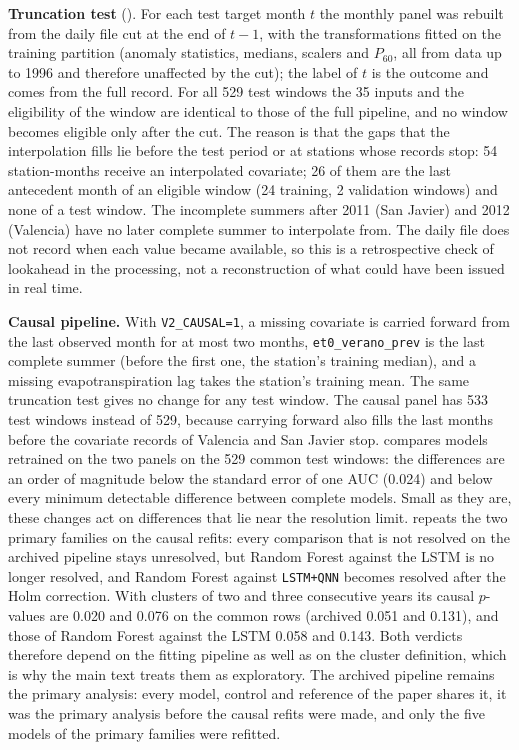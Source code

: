 \documentclass[11pt,a4paper]{article}
\begin{document}
\textbf{Truncation test} (). For each test target month $t$ the monthly panel was rebuilt from the daily file cut at the end of $t-1$, with the transformations fitted on the training partition (anomaly statistics, medians, scalers and $P_{60}$, all from data up to 1996 and therefore unaffected by the cut); the label of $t$ is the outcome and comes from the full record. For all 529 test windows the 35 inputs and the eligibility of the window are identical to those of the full pipeline, and no window becomes eligible only after the cut. The reason is that the gaps that the interpolation fills lie before the test period or at stations whose records stop: 54 station-months receive an interpolated covariate; 26 of them are the last antecedent month of an eligible window (24 training, 2 validation windows) and none of a test window. The incomplete summers after 2011 (San Javier) and 2012 (Valencia) have no later complete summer to interpolate from. The daily file does not record when each value became available, so this is a retrospective check of lookahead in the processing, not a reconstruction of what could have been issued in real time.

\textbf{Causal pipeline.} With \texttt{V2\_CAUSAL=1}, a missing covariate is carried forward from the last observed month for at most two months, \texttt{et0\_verano\_prev} is the last complete summer (before the first one, the station's training median), and a missing evapotranspiration lag takes the station's training mean. The same truncation test gives no change for any test window. The causal panel has 533 test windows instead of 529, because carrying forward also fills the last months before the covariate records of Valencia and San Javier stop.  compares models retrained on the two panels on the 529 common test windows: the differences are an order of magnitude below the standard error of one AUC (0.024) and below every minimum detectable difference between complete models. Small as they are, these changes act on differences that lie near the resolution limit.  repeats the two primary families on the causal refits: every comparison that is not resolved on the archived pipeline stays unresolved, but Random Forest against the LSTM is no longer resolved, and Random Forest against \texttt{LSTM+QNN} becomes resolved after the Holm correction. With clusters of two and three consecutive years its causal $p$-values are 0.020 and 0.076 on the common rows (archived 0.051 and 0.131), and those of Random Forest against the LSTM 0.058 and 0.143. Both verdicts therefore depend on the fitting pipeline as well as on the cluster definition, which is why the main text treats them as exploratory. The archived pipeline remains the primary analysis: every model, control and reference of the paper shares it, it was the primary analysis before the causal refits were made, and only the five models of the primary families were refitted.
\end{document}
